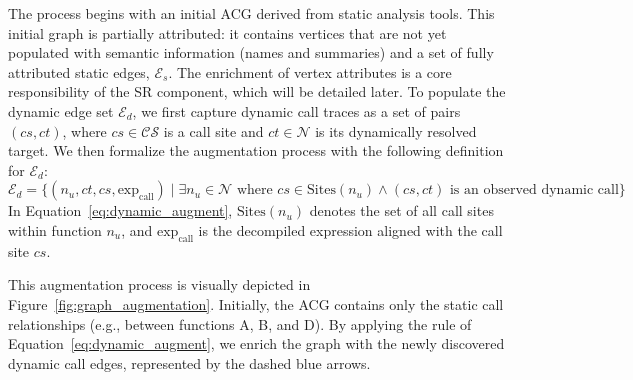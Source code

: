 \documentclass[acmsmall,screen,review,anonymous]{acmart} %
\begin{document}
The process begins with an initial ACG derived from static analysis tools. This initial graph is partially attributed: it contains vertices that are not yet populated with semantic information (names and summaries) and a set of fully attributed static edges, \(\mathcal{E}_s\). The enrichment of vertex attributes is a core responsibility of the SR component, which will be detailed later. To populate the dynamic edge set \(\mathcal{E}_d\), we first capture dynamic call traces as a set of pairs \((cs, ct)\), where \(cs \in \mathcal{CS}\) is a call site and \(ct \in \mathcal{N}\) is its dynamically resolved target. We then formalize the augmentation process with the following definition for \(\mathcal{E}_d\):
\begin{equation}
\label{eq:dynamic_augment}
\mathcal{E}_d = \{ (n_u, ct, cs, \text{exp}_{\text{call}}) \mid \exists n_u \in \mathcal{N} \text{ where } cs \in \text{Sites}(n_u) \land (cs, ct) \text{ is an observed dynamic call} \}
\end{equation}
In Equation~\ref{eq:dynamic_augment}, \(\text{Sites}(n_u)\) denotes the set of all call sites within function \(n_u\), and \(\text{exp}_{\text{call}}\) is the decompiled expression aligned with the call site \(cs\).

This augmentation process is visually depicted in Figure~\ref{fig:graph_augmentation}. Initially, the ACG contains only the static call relationships (e.g., between functions A, B, and D). By applying the rule of Equation~\ref{eq:dynamic_augment}, we enrich the graph with the newly discovered dynamic call edges, represented by the dashed blue arrows.




\end{document}
